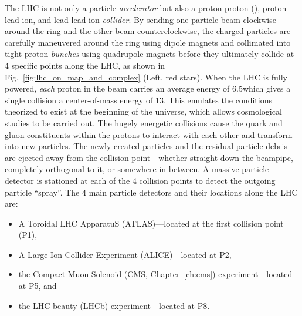 The LHC is not only a particle \emph{accelerator} but also a proton-proton (\pp), proton-lead ion, and lead-lead ion \emph{collider}.
By sending one particle beam clockwise around the ring and the other beam counterclockwise, the charged particles are carefully maneuvered around the ring using dipole magnets and collimated into tight proton \emph{bunches} using quadrupole magnets before they ultimately collide at 4 specific points along the LHC, as shown in Fig.~\ref{fig:lhc_on_map_and_complex} (Left, red stars).
When the LHC is fully powered, \emph{each} proton in the beam carries an average energy of 6.5\TeV which gives a single \pp collision a center-of-mass energy of 13\TeV.
This emulates the conditions theorized to exist at the beginning of the universe, which allows cosmological studies to be carried out.
The hugely energetic \pp collisions cause the quark and gluon constituents within the protons to interact with each other and transform into new particles.
The newly created particles and the residual particle debris are ejected away from the collision point---whether straight down the beampipe, completely orthogonal to it, or somewhere in between.
A massive particle detector is stationed at each of the 4 collision points to detect the outgoing particle ``spray''.
The 4 main particle detectors and their locations along the LHC are:
\begin{itemize}
    \item A Toroidal LHC ApparatuS (ATLAS)---located at the first collision point (P1),
    \item A Large Ion Collider Experiment (ALICE)---located at P2,
    \item the Compact Muon Solenoid (CMS, Chapter~\ref{ch:cms}) experiment---located at P5, and
    \item the LHC-beauty (LHCb) experiment---located at P8.
\end{itemize}
